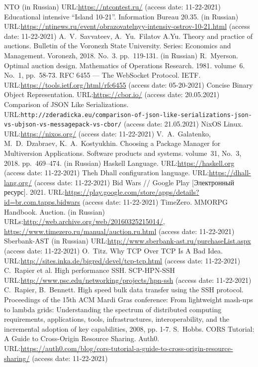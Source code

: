 \documentclass[
]{ceurart}
\begin{document}
\begin{thebibliography}{99}
    NTO (in Russian) URL:\url{https://ntcontest.ru/} (access date: 11-22-2021)
    Educational intensive ``Island 10-21''. Information Bureau 20.35. (in Russian) URL:\url{https://ntinews.ru/event/obrazovatelnyy-intensiv-ostrov-10-21.html} (access date: 11-22-2021)
    A.~V.~Savvateev, A.~Yu.~Filatov A.Yu. Theory and practice of auctions. Bulletin of the Voronezh State University. Series: Economics and Management. Voronezh, 2018. No.~3. pp.~119-131. (in Russian)
    R.~Myerson. Optimal auction design. Mathematics of Operations Research. 1981. volume~6. No.~1, pp.~58-73. 
    RFC 6455 — The WebSocket Protocol. IETF. URL:\url{https://tools.ietf.org/html/rfc6455} (access date: 05-20-2021)
    Concise Binary Object Representation. URL:\url{https://cbor.io/} (access date: 20.05.2021)
    Comparison of JSON Like Serializations. URL:\texttt{http://zderadicka.eu/comparison-of-json-like-serializations-json-vs-ubjson-vs-messagepack-vs-cbor/} (access date: 21.05.2021)
    NixOS Linux. URL:\url{https://nixos.org/} (access date: 11-22-2021)
    V.~A.~Galatenko, M.~D.~Dzabraev, K.~A.~Kostyukhin. Choosing a Package Manager for Multiversion Applications. Software products and systems. volume~31, No.~3, 2018. pp.~469–474. (in Russian) 
    Haskell Language. URL:\url{https://haskell.org} (access date: 11-22-2021)
    Theh Dhall configuration language. URL:\url{https://dhall-lang.org/} (access date: 11-22-2021)
	 Bid Wars // Google Play [Электронный ресурс]. 2021. URL:\url{https://play.google.com/store/apps/details?id=br.com.tapps.bidwars} (access date: 11-22-2021)
    TimeZero. MMORPG Handbook. Auction. (in Russian) URLs:\url{http://web.archive.org/web/20160325215014/}, \url{https://www.timezero.ru/manual/auction.ru.html} (access date: 11-22-2021)
    Sberbank-AST (in Russian) URL:\url{http://www.sberbank-ast.ru/purchaseList.aspx} (access date: 11-22-2021)
    O.~Titz. Why TCP Over TCP Is A Bad Idea. URL:\url{http://sites.inka.de/bigred/devel/tcp-tcp.html} (access date: 11-22-2021)
    C.~Rapier et al. High performance SSH. SCP-HPN-SSH URL:\url{http://www.psc.edu/networking/projects/hpn-ssh} (access date: 11-22-2021)
    C.~Rapier, B.~Bennett. High speed bulk data transfer using the SSH protocol. Proceedings of the 15th ACM Mardi Gras conference: From lightweight mash-ups to lambda grids: Understanding the spectrum of distributed computing requirements, applications, tools, infrastructures, interoperability, and the incremental adoption of key capabilities, 2008,  pp. 1-7. 
    S.~Hobbs. CORS Tutorial: A Guide to Cross-Origin Resource Sharing. Auth0. URL:\url{https://auth0.com/blog/cors-tutorial-a-guide-to-cross-origin-resource-sharing/} (access date: 11-22-2021)
\end{thebibliography}

\end{document}
